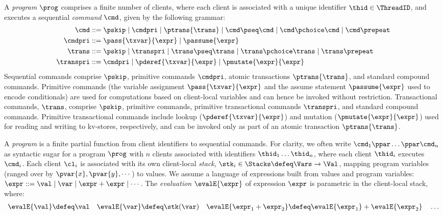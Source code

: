 A \emph{program} \( \prog \) comprises a finite number of clients,
where each client is associated with a unique identifier \( \thid \in \ThreadID \), 
and executes a sequential \emph{command} $\cmd$, given by the following grammar:
\begin{align*}
\cmd & ::=  
\pskip \mid 
\cmdpri \mid  
\ptrans{\trans} \mid 
\cmd \pseq \cmd \mid 
\cmd \pchoice \cmd \mid 
\cmd \prepeat  
\\
\cmdpri & ::=  
\pass{\txvar}{\expr} \mid 
\passume{\expr} 
\\
\trans & ::=
\pskip \mid
\transpri \mid 
\trans \pseq \trans \mid
\trans \pchoice \trans \mid
\trans\prepeat    
\\
\transpri & ::= 
\cmdpri \mid
\pderef{\txvar}{\expr} \mid
\pmutate{\expr}{\expr} 
\end{align*} 
%
%
%
Sequential commands  comprise $\pskip$,  primitive commands $\cmdpri
$, atomic transactions
$\ptrans{\trans}$,  and standard
compound commands. 
Primitive commands (the variable assignment
$\pass{\txvar}{\expr}$ and the assume statement $\passume{\expr}$
used to encode conditionals) are used for computations based on 
client-local variables 
and can hence be invoked without restriction. 
Transactional commands, $\trans$, 
comprise $\pskip$, primitive commands, 
primitive transactional commands $\transpri$,  and standard compound commands. 
Primitive transactional commands include lookup ($\pderef{\txvar}{\expr}$) and mutation 
($\pmutate{\expr}{\expr}$) used for reading and writing to kv-stores, respectively, and  
can be invoked only as part of an atomic transaction $\ptrans{\trans}$.

A {\em program} is a finite partial function from client identifiers to sequential
commands.
For clarity, we often write \( \cmd_{1}\ppar \dots \ppar \cmd_{n}\) as syntactic sugar 
for a program \( \prog \) with $n$ clients associated with identifiers
$\thid_1 \dots \thid_n$, where each client $\thid_i$ executes
$\cmd_i$. 
Each client $\cl_i$ is associated with its own client-local  \emph{stack}, 
$\stk_i \in \Stacks \defeq \Vars \to \Val$,  mapping program variables
(ranged over by $\pvar{x}, \pvar{y}, \cdots$)
to values. 
We assume a language of expressions built from values
and program variables:
$\expr ::= \val \mid \var \mid \expr + \expr \mid \cdots$.
The \emph{evaluation} $\evalE{\expr}$ of  expression $\expr$ is parametric in
the client-local stack, where:
\begin{gather*}
\evalE{\val} \defeq
\val
\quad
\evalE{\var} \defeq
\stk(\var)
\quad
\evalE{\expr_{1} + \expr_{2}} \defeq
\evalE{\expr_{1}} + \evalE{\expr_{2}}
\quad
\dots
\end{gather*}

